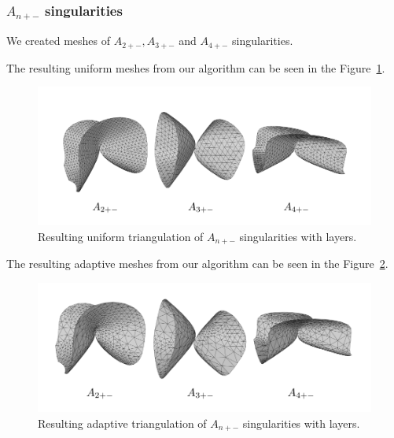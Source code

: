 \clearpage
\subsubsection*{$A_{n+-}$ singularities}
We created meshes of $A_{2+-}, A_{3+-}$ and $A_{4+-}$ singularities.

The resulting uniform meshes from our algorithm can be seen in the 
Figure~\ref{img:63}.
\begin{figure}[h!]
    \centerline{\includegraphics[scale=0.5]{images/img63}}
    \caption[Resulting uniform triangulation of $A_{n+-}$ singularities]
    {Resulting uniform triangulation of $A_{n+-}$ singularities with layers.}
    \label{img:63}
\end{figure}

The resulting adaptive meshes from our algorithm can be seen in the 
Figure~\ref{img:65}.
\begin{figure}[h!]
    \centerline{\includegraphics[scale=0.5]{images/img65}}
    \caption[Resulting adaptive triangulation of $A_{n+-}$ singularities]
    {Resulting adaptive triangulation of $A_{n+-}$ singularities with layers.}
    \label{img:65}
\end{figure}

